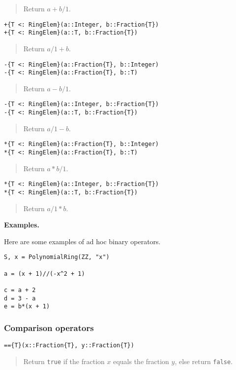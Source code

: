 \documentclass[a4paper,10pt]{article}
\newcommand{\code}{\lstinline}
\newcommand{\desc}[1]{\vspace{-3mm}\begin{quote}#1\end{quote}}
\begin{document}
\desc{Return $a + b/1$.}

\begin{lstlisting}
+{T <: RingElem}(a::Integer, b::Fraction{T})
+{T <: RingElem}(a::T, b::Fraction{T})
\end{lstlisting}

\desc{Return $a/1 + b$.}

\begin{lstlisting}
-{T <: RingElem}(a::Fraction{T}, b::Integer)
-{T <: RingElem}(a::Fraction{T}, b::T)
\end{lstlisting}

\desc{Return $a - b/1$.}

\begin{lstlisting}
-{T <: RingElem}(a::Integer, b::Fraction{T})
-{T <: RingElem}(a::T, b::Fraction{T})
\end{lstlisting}

\desc{Return $a/1 - b$.}

\begin{lstlisting}
*{T <: RingElem}(a::Fraction{T}, b::Integer)
*{T <: RingElem}(a::Fraction{T}, b::T)
\end{lstlisting}

\desc{Return $a * b/1$.}

\begin{lstlisting}
*{T <: RingElem}(a::Integer, b::Fraction{T})
*{T <: RingElem}(a::T, b::Fraction{T})
\end{lstlisting}

\desc{Return $a/1 * b$.}

\textbf{Examples.}

Here are some examples of ad hoc binary operators.

\begin{lstlisting}
S, x = PolynomialRing(ZZ, "x")

a = (x + 1)//(-x^2 + 1)

c = a + 2
d = 3 - a
e = b*(x + 1)
\end{lstlisting}

\subsubsection{Comparison operators}

\begin{lstlisting}
=={T}(x::Fraction{T}, y::Fraction{T})
\end{lstlisting}

\desc{Return \code{true} if the fraction $x$ equals the fraction $y$, else
return \code{false}.}
\end{document}
